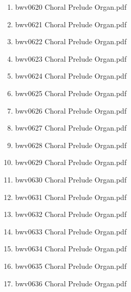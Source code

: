 \documentclass[11pt]{article}
\begin{document}
\begin{enumerate}
\begin{enumerate}
\begin{enumerate}
\begin{enumerate}
\item bwv0620   Choral Prelude Organ.pdf
\label{sec-1-1-1-1-44-6-4-1-12-22}

\item bwv0621   Choral Prelude Organ.pdf
\label{sec-1-1-1-1-44-6-4-1-12-23}

\item bwv0622   Choral Prelude Organ.pdf
\label{sec-1-1-1-1-44-6-4-1-12-24}

\item bwv0623   Choral Prelude Organ.pdf
\label{sec-1-1-1-1-44-6-4-1-12-25}

\item bwv0624   Choral Prelude Organ.pdf
\label{sec-1-1-1-1-44-6-4-1-12-26}

\item bwv0625   Choral Prelude Organ.pdf
\label{sec-1-1-1-1-44-6-4-1-12-27}

\item bwv0626   Choral Prelude Organ.pdf
\label{sec-1-1-1-1-44-6-4-1-12-28}

\item bwv0627   Choral Prelude Organ.pdf
\label{sec-1-1-1-1-44-6-4-1-12-29}

\item bwv0628   Choral Prelude Organ.pdf
\label{sec-1-1-1-1-44-6-4-1-12-30}

\item bwv0629   Choral Prelude Organ.pdf
\label{sec-1-1-1-1-44-6-4-1-12-31}

\item bwv0630   Choral Prelude Organ.pdf
\label{sec-1-1-1-1-44-6-4-1-12-32}

\item bwv0631   Choral Prelude Organ.pdf
\label{sec-1-1-1-1-44-6-4-1-12-33}

\item bwv0632   Choral Prelude Organ.pdf
\label{sec-1-1-1-1-44-6-4-1-12-34}

\item bwv0633   Choral Prelude Organ.pdf
\label{sec-1-1-1-1-44-6-4-1-12-35}

\item bwv0634   Choral Prelude Organ.pdf
\label{sec-1-1-1-1-44-6-4-1-12-36}

\item bwv0635   Choral Prelude Organ.pdf
\label{sec-1-1-1-1-44-6-4-1-12-37}

\item bwv0636   Choral Prelude Organ.pdf
\label{sec-1-1-1-1-44-6-4-1-12-38}


\end{enumerate}
\end{enumerate}
\end{enumerate}
\end{enumerate}
\end{document}

